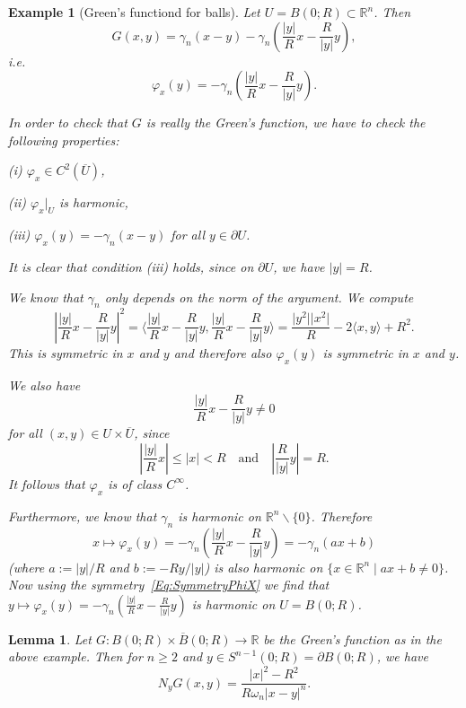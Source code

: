 \documentclass[12pt, oneside, a4paper]{article}
\newtheorem{lem}[thm]{Lemma}
\theoremstyle{dfn}
\newtheorem{ex}[thm]{Example}
\newcommand{\scalprod}[2]{\langle #1,#2 \rangle}
\def\Rbb{\ensuremath{\mathbb{R}}}
\renewcommand{\phi}{\varphi}
\providecommand{\abs}[1]{\lvert#1\rvert}
\providecommand{\Abs}[1]{\left\lvert#1\right\rvert}
\begin{document}
\begin{ex}[Green's functiond for balls]
Let $U = B(0;R) \subset \Rbb^n$. Then
\[
G(x,y) = \gamma_n(x-y) - \gamma_n \left( \frac{\abs{y}}{R} x - \frac{R}{\abs{y}} y \right),
\]
i.e.\
\[
\phi_x(y) = - \gamma_n \left( \frac{\abs{y}}{R} x - \frac{R}{\abs{y}} y \right).
\]

In order to check that $G$ is really the Green's function, we have to check the following properties:

\indent \indent (i) $\phi_x \in C^2(\overline{U})$,

\indent \indent (ii) $\phi_x|_U$ is harmonic,

\indent \indent (iii) $\phi_x(y) = - \gamma_n(x-y)$ for all $y \in \partial U$.

It is clear that condition (iii) holds, since on $\partial U$, we have $\abs{y} = R$.

We know that $\gamma_n$ only depends on the norm of the argument. We compute
\begin{equation}\label{Eq:SymmetryPhiX}
\Abs{ \frac{\abs{y}}{R} x - \frac{R}{\abs{y}} y }^2
= \scalprod{ \frac{\abs{y}}{R} x - \frac{R}{\abs{y}} y }{ \frac{\abs{y}}{R} x - \frac{R}{\abs{y}} y }
= \frac{\abs{y^2}\abs{x^2}}{R} - 2 \scalprod{x}{y} + R^2.
\end{equation}
This is symmetric in $x$ and $y$ and therefore also $\phi_x(y)$ is symmetric in $x$ and $y$.

We also have
\[
\frac{\abs{y}}{R} x - \frac{R}{\abs{y}} y \neq 0
\]
for all $(x,y) \in U \times \overline{U}$, since
\[
\Abs{\frac{\abs{y}}{R}x} \leqslant \abs{x} < R
\quad \text{and} \quad
\Abs{\frac{R}{\abs{y}}y} = R.
\]
It follows that $\phi_x$ is of class $C^\infty$.

Furthermore, we know that $\gamma_n$ is harmonic on $\Rbb^n \smallsetminus \{0\}$. Therefore
\[
x \mapsto \phi_x(y) = -\gamma_n\left( \frac{\abs{y}}{R} x - \frac{R}{\abs{y}} y \right) = - \gamma_n(ax + b)
\]
(where $a:= \abs{y}/R$ and $b := -Ry/\abs{y}$) is also harmonic on $\{x \in \Rbb^n \mid ax + b \neq 0\}$. Now using the symmetry~\eqref{Eq:SymmetryPhiX} we find that $y \mapsto \phi_x(y) = -\gamma_n\left( \frac{\abs{y}}{R} x - \frac{R}{\abs{y}} y \right)$ is harmonic on $U = B(0;R)$.
\end{ex}

\begin{lem}\label{Lemma:NyOfGreenFForBalls}
Let $G \colon B(0;R) \times \overline{B}(0;R) \to \Rbb$ be the Green's function as in the above example. Then for $n \geqslant 2$ and $y \in S^{n-1}(0;R) = \partial B(0;R)$, we have
\[
N_y G(x,y) = \frac{\abs{x}^2 - R^2}{R \omega_n \abs{x-y}^n}.
\]
\end{lem}
\end{document}
